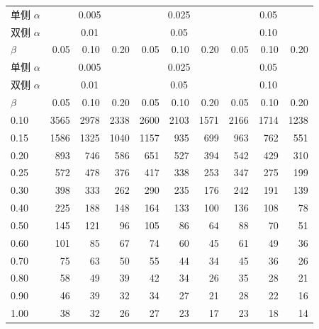 {\small\setlength{\tabcolsep}{4pt}
\begin{longtable}{lrrrrrrrrr}
\toprule
单侧 $\alpha$ & \multicolumn{3}{c}{0.005} & \multicolumn{3}{c}{0.025} & \multicolumn{3}{c}{0.05}\\
双侧 $\alpha$ & \multicolumn{3}{c}{0.01} & \multicolumn{3}{c}{0.05} & \multicolumn{3}{c}{0.10}\\
$\beta$ & 0.05 & 0.10 & 0.20 & 0.05 & 0.10 & 0.20 & 0.05 & 0.10 & 0.20\\\midrule
\endfirsthead
\toprule
单侧 $\alpha$ & \multicolumn{3}{c}{0.005} & \multicolumn{3}{c}{0.025} & \multicolumn{3}{c}{0.05}\\
双侧 $\alpha$ & \multicolumn{3}{c}{0.01} & \multicolumn{3}{c}{0.05} & \multicolumn{3}{c}{0.10}\\
$\beta$ & 0.05 & 0.10 & 0.20 & 0.05 & 0.10 & 0.20 & 0.05 & 0.10 & 0.20\\\midrule
\endhead
0.10 & 3565 & 2978 & 2338 & 2600 & 2103 & 1571 & 2166 & 1714 & 1238\\
0.15 & 1586 & 1325 & 1040 & 1157 & 935 & 699 & 963 & 762 & 551\\
0.20 & 893 & 746 & 586 & 651 & 527 & 394 & 542 & 429 & 310\\
0.25 & 572 & 478 & 376 & 417 & 338 & 253 & 347 & 275 & 199\\
0.30 & 398 & 333 & 262 & 290 & 235 & 176 & 242 & 191 & 139\\
0.40 & 225 & 188 & 148 & 164 & 133 & 100 & 136 & 108 & 78\\
0.50 & 145 & 121 & 96 & 105 & 86 & 64 & 88 & 70 & 51\\
0.60 & 101 & 85 & 67 & 74 & 60 & 45 & 61 & 49 & 36\\
0.70 & 75 & 63 & 50 & 55 & 44 & 34 & 45 & 36 & 26\\
0.80 & 58 & 49 & 39 & 42 & 34 & 26 & 35 & 28 & 21\\
0.90 & 46 & 39 & 32 & 34 & 27 & 21 & 28 & 22 & 16\\
1.00 & 38 & 32 & 26 & 27 & 23 & 17 & 23 & 18 & 14\\\bottomrule
\end{longtable}}
